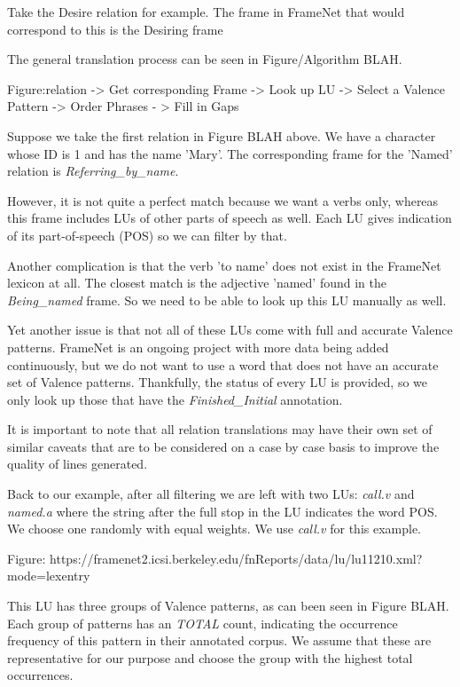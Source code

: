 Take the Desire relation for example. The frame in FrameNet that would correspond to this is the Desiring frame

The general translation process can be seen in Figure/Algorithm BLAH.

Figure:relation -> Get corresponding Frame -> Look up LU -> Select a Valence Pattern -> Order Phrases - > Fill in Gaps

Suppose we take the first relation in Figure BLAH above. We have a character whose ID is 1 and has the name 'Mary'. The corresponding frame for the 'Named' relation is \textit{Referring\_by\_name}. 

However, it is not quite a perfect match because we want a verbs only, whereas this frame includes LUs of other parts of speech as well. Each LU gives indication of its part-of-speech (POS) so we can filter by that. 

Another complication is that the verb 'to name' does not exist in the FrameNet lexicon at all. The closest match is the adjective 'named' found in the \textit{Being\_named} frame. So we need to be able to look up this LU manually as well.

Yet another issue is that not all of these LUs come with full and accurate Valence patterns. FrameNet is an ongoing project with more data being added continuously, but we do not want to use a word that does not have an accurate set of Valence patterns. Thankfully, the status of every LU is provided, so we only look up those that have the \textit{Finished\_Initial} annotation.

It is important to note that all relation translations may have their own set of similar caveats that are to be considered on a case by case basis to improve the quality of lines generated.

Back to our example, after all filtering we are left with two LUs: \textit{call.v} and \textit{named.a} where the string after the full stop in the LU indicates the word POS. We choose one randomly with equal weights. We use \textit{call.v} for this example.

Figure: https://framenet2.icsi.berkeley.edu/fnReports/data/lu/lu11210.xml?mode=lexentry

This LU has three groups of Valence patterns, as can been seen in Figure BLAH. Each group of patterns has an \textit{TOTAL} count, indicating the occurrence frequency of this pattern in their annotated corpus. We assume that these are representative for our purpose and choose the group with the highest total occurrences.

